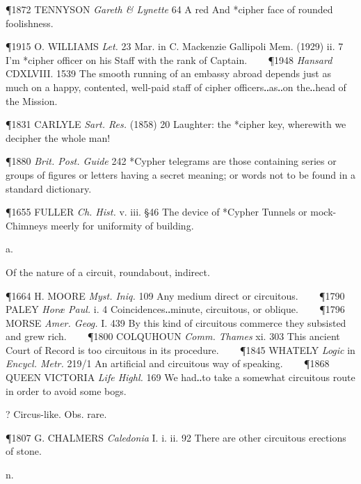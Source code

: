 \begin{description}[wide, labelwidth=!, labelindent=0pt]
\begin{myenumerate}
\P 1872 TENNYSON  \textit{Gareth \& Lynette} 64 A red And *cipher face of rounded foolishness.

\P 1915 O. WILLIAMS  \textit{Let.} 23 Mar. in C. Mackenzie Gallipoli Mem. (1929) ii. 7 I'm *cipher officer on his Staff with the rank of Captain.    
\P 1948 \textit{Hansard} CDXLVIII. 1539 The  smooth running of an embassy abroad depends just as much on a happy, contented, well-paid staff of cipher officers‥as‥on the‥head of the Mission.

\P 1831 CARLYLE  \textit{Sart. Res.} (1858) 20 Laughter: the *cipher key, wherewith we decipher the whole man!

\P 1880  \textit{Brit. Post. Guide} 242 *Cypher telegrams are those containing series or groups of figures or letters having a secret meaning; or words not to be found in a standard dictionary.

\P 1655 FULLER  \textit{Ch. Hist.} v. iii. §46 The device of *Cypher Tunnels or mock-Chimneys meerly for uniformity of building.
\end{myenumerate}


 a.

\noindent {}


\noindent
Of the nature of a circuit, roundabout, indirect.

\P 1664 H. MOORE  \textit{Myst. Iniq.} 109 Any medium direct or circuitous.    
\P 1790 PALEY  \textit{Horæ Paul.} i. 4 Coincidences‥minute, circuitous, or oblique.    
\P 1796 MORSE  \textit{Amer. Geog.} I. 439 By this kind of circuitous commerce they subsisted and grew rich.    
\P 1800 COLQUHOUN  \textit{Comm. Thames} xi. 303 This ancient Court of Record is too circuitous in its procedure.    
\P 1845 WHATELY  \textit{Logic} in \textit{Encycl. Metr.} 219/1 An artificial and circuitous way of speaking.    
\P 1868 QUEEN VICTORIA  \textit{Life Highl.} 169 We had‥to take a somewhat circuitous route in order to avoid some bogs.

 ? Circus-like. Obs. rare.

\P 1807 G. CHALMERS  \textit{Caledonia} I. i. ii. 92 There are other circuitous erections of stone.




 n.

\noindent {}


\end{description}

